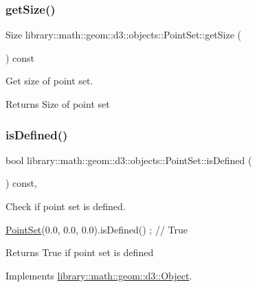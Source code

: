 \subsubsection{\texorpdfstring{get\+Size()}{getSize()}}
{\footnotesize\ttfamily Size library\+::math\+::geom\+::d3\+::objects\+::\+Point\+Set\+::get\+Size (\begin{DoxyParamCaption}{ }\end{DoxyParamCaption}) const}



Get size of point set. 

\begin{DoxyReturn}{Returns}
Size of point set 
\end{DoxyReturn}
\mbox{\label{classlibrary_1_1math_1_1geom_1_1d3_1_1objects_1_1_point_set_abeb7f866a32d25448d1ddb00c6c5e7b0}} 
\subsubsection{\texorpdfstring{is\+Defined()}{isDefined()}}
{\footnotesize\ttfamily bool library\+::math\+::geom\+::d3\+::objects\+::\+Point\+Set\+::is\+Defined (\begin{DoxyParamCaption}{ }\end{DoxyParamCaption}) const\hspace{0.3cm}{\ttfamily [override]}, {\ttfamily [virtual]}}



Check if point set is defined. 


\begin{DoxyCode}
\hyperlink{classlibrary_1_1math_1_1geom_1_1d3_1_1objects_1_1_point_set_a6f9624b8c6bb3aa9d57a35a6fa2e0fba}{PointSet}(0.0, 0.0, 0.0).isDefined() ; \textcolor{comment}{// True}
\end{DoxyCode}


\begin{DoxyReturn}{Returns}
True if point set is defined 
\end{DoxyReturn}


Implements \hyperlink{classlibrary_1_1math_1_1geom_1_1d3_1_1_object_a2216442e322f0c3ca5f01a4efa22baf7}{library\+::math\+::geom\+::d3\+::\+Object}.


